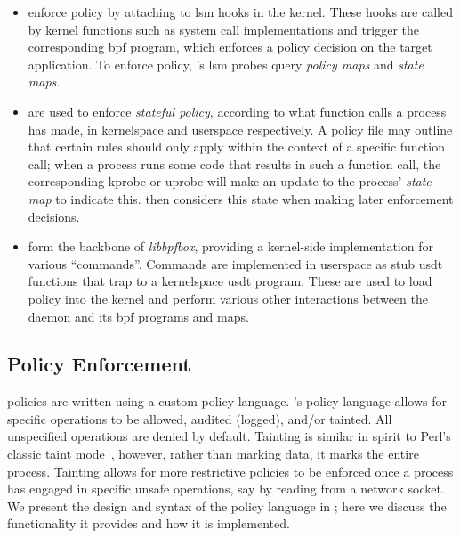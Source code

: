 \begin{itemize}
  \item \textbf{} enforce policy by attaching to \gls{lsm} hooks in the
  kernel. These hooks are called by kernel functions such as system call implementations
  and trigger the corresponding \gls{bpf} program, which enforces a policy decision on the
  target application. To enforce policy, \bpfbox{}'s \gls{lsm} probes query \textit{policy
  maps} and \textit{state maps}.

  \item \textbf{} are used to enforce \textit{stateful policy},
  according to what function calls a process has made, in kernelspace and userspace
  respectively. A \bpfbox{} policy file may outline that certain rules should only apply
  within the context of a specific function call; when a process runs some code that
  results in such a function call, the corresponding kprobe or uprobe will make an update
  to the process' \textit{state map} to indicate this. \bpfbox{} then considers this state
  when making later enforcement decisions.

  \item \textbf{} form the backbone of \textit{libbpfbox},
  providing a kernel-side implementation for various \enquote{commands}. Commands are
  implemented in userspace as stub \gls{usdt} functions that trap to a kernelspace
  \gls{usdt} program. These are used to load policy into the kernel and perform various
  other interactions between the daemon and its \gls{bpf} programs and maps.
\end{itemize}

\subsection{\bpfbox{} Policy Enforcement}%
\label{ss:bpfbox-enforcement}

\bpfbox{} policies are written using a custom policy language.  \bpfbox{}'s policy
language allows for specific operations to be allowed, audited (logged), and/or tainted.
All unspecified operations are denied by default. Tainting is similar in spirit to Perl's
classic taint mode~\cite{hurst2004_perl}, however, rather than marking data, it marks the
entire process.  Tainting allows for more restrictive policies to be enforced once
a process has engaged in specific unsafe operations, say by reading from a network socket.
We present the design and syntax of the \bpfbox{} policy language in
; here we discuss the functionality it provides and how it is
implemented.

